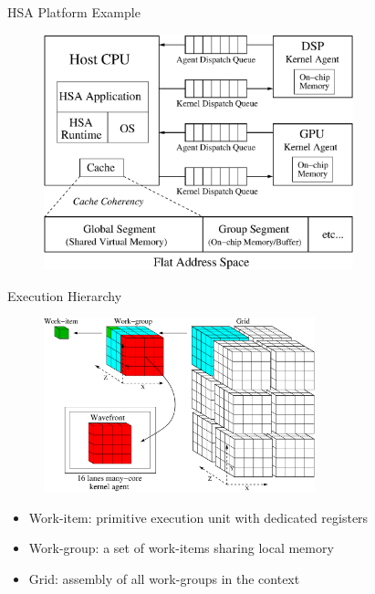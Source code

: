 \documentclass{beamer}
\begin{document}
\begin{CJK}{UTF8}{bkai}
            \begin{frame}{HSA Platform Example}
                \begin{figure}[!ht]
                    \centering
                    \includegraphics[width=0.8\textwidth]{./figs/systemspec.eps}
                    \label{fig:systemspec}
                \end{figure}
            \end{frame}

            \begin{frame}{Execution Hierarchy}
                \begin{figure}[t] 
                    \centering
                    \includegraphics[width=0.7\textwidth]{./figs/grid.eps}
                    \label{fig:grid}
                \end{figure}%
                \begin{itemize}
                    \item <2-> {Work-item: primitive execution unit with dedicated registers}
                    \item <3-> {Work-group: a set of work-items sharing local memory}
                    \item <4-> {Grid: assembly of all work-groups in the context}
                \end{itemize}
            \end{frame}


\end{CJK}
\end{document}
